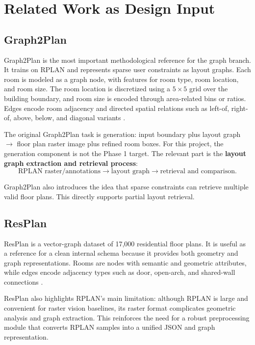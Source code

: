 \documentclass[11pt,a4paper]{article}
\begin{document}
\section{Related Work as Design Input}

\subsection{Graph2Plan}

Graph2Plan is the most important methodological reference for the graph branch. It trains on RPLAN and represents sparse user constraints as layout graphs. Each room is modeled as a graph node, with features for room type, room location, and room size. The room location is discretized using a $5 \times 5$ grid over the building boundary, and room size is encoded through area-related bins or ratios. Edges encode room adjacency and directed spatial relations such as left-of, right-of, above, below, and diagonal variants \cite{graph2plan}.

The original Graph2Plan task is generation: input boundary plus layout graph $\rightarrow$ floor plan raster image plus refined room boxes. For this project, the generation component is not the Phase 1 target. The relevant part is the \textbf{layout graph extraction and retrieval process}:
\[
\text{RPLAN raster/annotations} \rightarrow \text{layout graph} \rightarrow \text{retrieval and comparison}.
\]

Graph2Plan also introduces the idea that sparse constraints can retrieve multiple valid floor plans. This directly supports partial layout retrieval.

\subsection{ResPlan}

ResPlan is a vector-graph dataset of 17,000 residential floor plans. It is useful as a reference for a clean internal schema because it provides both geometry and graph representations. Rooms are nodes with semantic and geometric attributes, while edges encode adjacency types such as door, open-arch, and shared-wall connections \cite{resplan}.

ResPlan also highlights RPLAN's main limitation: although RPLAN is large and convenient for raster vision baselines, its raster format complicates geometric analysis and graph extraction. This reinforces the need for a robust preprocessing module that converts RPLAN samples into a unified JSON and graph representation.
\end{document}
